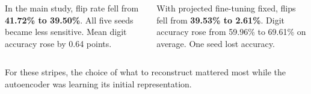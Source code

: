 \begin{columns}[T,onlytextwidth]
\par\medskip
In the main study, flip rate fell from \textbf{41.72\% to 39.50\%}. All five seeds became less sensitive. Mean digit accuracy rose by 0.64 points.
\par\medskip
With projected fine-tuning fixed, flips fell from \textbf{39.53\% to 2.61\%}. Digit accuracy rose from 59.96\% to 69.61\% on average. One seed lost accuracy.
\end{columns}
\vspace{7mm}
For these stripes, the choice of what to reconstruct mattered most while the autoencoder was learning its initial representation.
